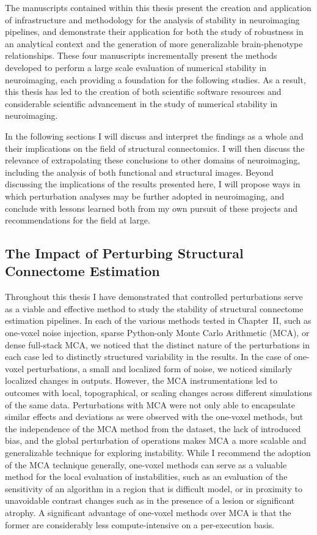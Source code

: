 The manuscripts contained within this thesis present the creation and application of infrastructure and
methodology for the analysis of stability in neuroimaging pipelines, and demonstrate their application for both
the study of robustness in an analytical context and the generation of more generalizable brain-phenotype
relationships. These four manuscripts incrementally present the methods developed to perform a large scale
evaluation of numerical stability in neuroimaging, each providing a foundation for the following studies. As a
result, this thesis has led to the creation of both scientific software resources and considerable scientific
advancement in the study of numerical stability in neuroimaging.

In the following sections I will discuss and interpret the findings as a whole and their implications on the field
of structural connectomics. I will then discuss the relevance of extrapolating these conclusions to other domains
of neuroimaging, including the analysis of both functional and structural images. Beyond discussing the
implications of the results presented here, I will propose ways in which perturbation analyses may be further
adopted in neuroimaging, and conclude with lessons learned both from my own pursuit of these projects and
recommendations for the field at large.

\subsection{The Impact of Perturbing Structural Connectome Estimation}

Throughout this thesis I have demonstrated that controlled perturbations serve as a viable and effective method
to study the stability of structural connectome estimation pipelines. In each of the various methods tested in
Chapter~II, such as one-voxel noise injection, sparse Python-only Monte Carlo Arithmetic (MCA), or dense full-stack
MCA, we noticed that the distinct nature of the perturbations in each case led to distinctly structured variability
in the results. In the case of one-voxel perturbations, a small and localized form of noise, we noticed similarly
localized changes in outputs. However, the MCA instrumentations led to outcomes with local, topographical, or scaling
changes across different simulations of the same data. Perturbations with MCA were not only able to encapsulate
similar effects and deviations as were observed with the one-voxel methods, but the independence of the MCA method
from the dataset, the lack of introduced bias, and the global perturbation of operations makes MCA a more scalable
and generalizable technique for exploring instability. While I recommend the adoption of the MCA technique generally,
one-voxel methods can serve as a valuable method for the local evaluation of instabilities, such as an evaluation of
the sensitivity of an algorithm in a region that is difficult model, or in proximity to unavoidable contrast changes
such as in the presence of a lesion or significant atrophy. A significant advantage of one-voxel methods over MCA is
that the former are considerably less compute-intensive on a per-execution basis.

